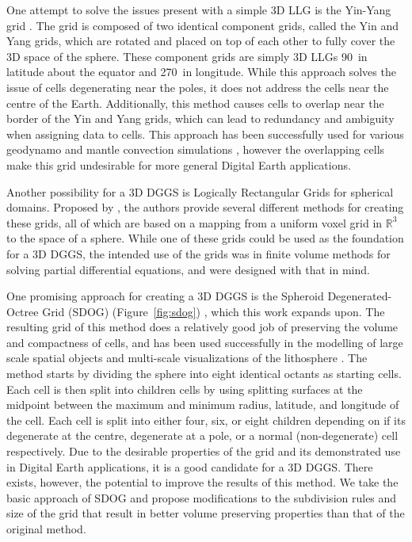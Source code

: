 One attempt to solve the issues present with a simple 3D LLG is the Yin-Yang grid \cite{kageyama2004yin-yang}. The grid is composed of two identical component grids, called the Yin and Yang grids, which are rotated and placed on top of each other to fully cover the 3D space of the sphere. These component grids are simply 3D LLGs 90\textdegree~in latitude about the equator and 270\textdegree~in longitude. While this approach solves the issue of cells degenerating near the poles, it does not address the cells near the centre of the Earth. Additionally, this method causes cells to overlap near the border of the Yin and Yang grids, which can lead to redundancy and ambiguity when assigning data to cells. This approach has been successfully used for various geodynamo and mantle convection simulations \cite{kageyama2004yin-yang, yoshida2004application, kageyama2005geodynamo, tackley2008modelling}, however the overlapping cells make this grid undesirable for more general Digital Earth applications. 

Another possibility for a 3D DGGS is Logically Rectangular Grids for spherical domains. Proposed by \cite{calhoun2008rectangluar}, the authors provide several different methods for creating these grids, all of which are based on a mapping from a uniform voxel grid in $\mathbb{R}^{3}$ to the space of a sphere. While one of these grids could be used as the foundation for a 3D DGGS, the intended use of the grids was in finite volume methods for solving partial differential equations, and were designed with that in mind.



One promising approach for creating a 3D DGGS is the Spheroid Degenerated-Octree Grid (SDOG) (Figure~\ref{fig:sdog}) \cite{yu2009sdog}, which this work expands upon. The resulting grid of this method does a relatively good job of preserving the volume and compactness of cells, and has been used successfully in the modelling of large scale spatial objects \cite{yu2012large-scale} and multi-scale visualizations of the lithosphere \cite{yu2012lithosphere}. The method starts by dividing the sphere into eight identical octants as starting cells. Each cell is then split into children cells by using splitting surfaces at the midpoint between the maximum and minimum radius, latitude, and longitude of the cell. Each cell is split into either four, six, or eight children depending on if its degenerate at the centre, degenerate at a pole, or a normal (non-degenerate) cell respectively. Due to the desirable properties of the grid and its demonstrated use in Digital Earth applications, it is a good candidate for a 3D DGGS. There exists, however, the potential to improve the results of this method. We take the basic approach of SDOG and propose modifications to the subdivision rules and size of the grid that result in better volume preserving properties than that of the original method.

